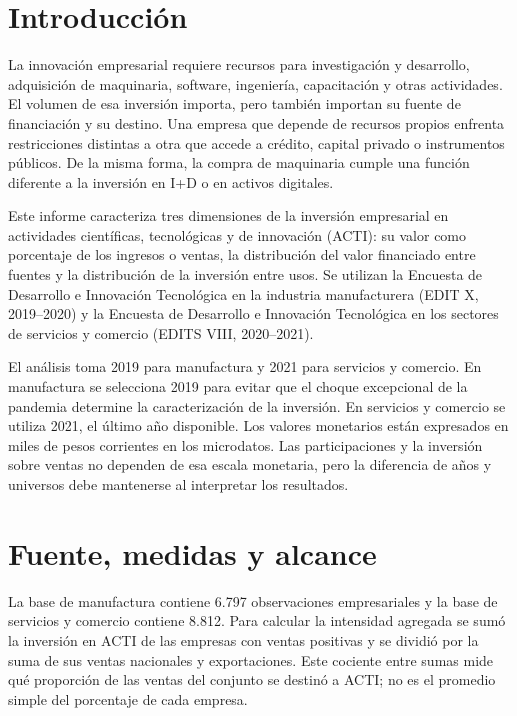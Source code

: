 \section{Introducción}

La innovación empresarial requiere recursos para investigación y desarrollo, adquisición de maquinaria, software, ingeniería, capacitación y otras actividades. El volumen de esa inversión importa, pero también importan su fuente de financiación y su destino. Una empresa que depende de recursos propios enfrenta restricciones distintas a otra que accede a crédito, capital privado o instrumentos públicos. De la misma forma, la compra de maquinaria cumple una función diferente a la inversión en I+D o en activos digitales.

Este informe caracteriza tres dimensiones de la inversión empresarial en actividades científicas, tecnológicas y de innovación (ACTI): su valor como porcentaje de los ingresos o ventas, la distribución del valor financiado entre fuentes y la distribución de la inversión entre usos. Se utilizan la Encuesta de Desarrollo e Innovación Tecnológica en la industria manufacturera (EDIT X, 2019--2020) y la Encuesta de Desarrollo e Innovación Tecnológica en los sectores de servicios y comercio (EDITS VIII, 2020--2021).

El análisis toma 2019 para manufactura y 2021 para servicios y comercio. En manufactura se selecciona 2019 para evitar que el choque excepcional de la pandemia determine la caracterización de la inversión. En servicios y comercio se utiliza 2021, el último año disponible. Los valores monetarios están expresados en miles de pesos corrientes en los microdatos. Las participaciones y la inversión sobre ventas no dependen de esa escala monetaria, pero la diferencia de años y universos debe mantenerse al interpretar los resultados.

\section{Fuente, medidas y alcance}

La base de manufactura contiene 6.797 observaciones empresariales y la base de servicios y comercio contiene 8.812. Para calcular la intensidad agregada se sumó la inversión en ACTI de las empresas con ventas positivas y se dividió por la suma de sus ventas nacionales y exportaciones. Este cociente entre sumas mide qué proporción de las ventas del conjunto se destinó a ACTI; no es el promedio simple del porcentaje de cada empresa.

